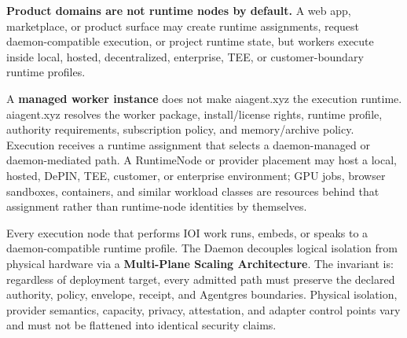 \documentclass[
  11pt,
]{article}
\begin{document}
\begin{center}
\end{center}

\textbf{Product domains are not runtime nodes by default.} A web app,
marketplace, or product surface may create runtime assignments, request
daemon-compatible execution, or project runtime state, but workers
execute inside local, hosted, decentralized, enterprise, TEE, or
customer-boundary runtime profiles.

A \textbf{managed worker instance} does not make aiagent.xyz the
execution runtime. aiagent.xyz resolves the worker package,
install/license rights, runtime profile, authority requirements,
subscription policy, and memory/archive policy. Execution receives a runtime
assignment that selects a daemon-managed or daemon-mediated path. A RuntimeNode
or provider placement may host a local, hosted, DePIN, TEE, customer, or
enterprise environment; GPU jobs, browser sandboxes, containers, and similar
workload classes are resources behind that assignment rather than runtime-node
identities by themselves.

Every execution node that performs IOI work runs, embeds, or speaks to a
daemon-compatible runtime profile. The Daemon decouples logical
isolation from physical hardware via a \textbf{Multi-Plane Scaling
Architecture}. The invariant is: regardless of deployment target, every
admitted path must preserve the declared authority, policy, envelope,
receipt, and Agentgres boundaries. Physical isolation, provider semantics,
capacity, privacy, attestation, and adapter control points vary and must not
be flattened into identical security claims.
\end{document}
